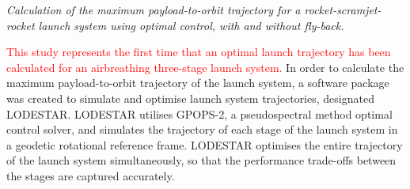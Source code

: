 	\vspace{10pt}
\emph{Calculation of the maximum payload-to-orbit trajectory for a rocket-scramjet-rocket launch system using optimal control, with and without fly-back.}

\textcolor{red}{This study represents the first time that an optimal launch trajectory has been calculated for an airbreathing three-stage launch system.}
In order to calculate the maximum payload-to-orbit trajectory of the launch system, a software package was created to simulate and optimise launch system trajectories, designated LODESTAR. LODESTAR utilises GPOPS-2, a pseudospectral method optimal control solver, and simulates the trajectory of each stage of the launch system in a geodetic rotational reference frame. 
LODESTAR optimises the entire trajectory of the launch system simultaneously, so that the performance trade-offs between the stages are captured accurately.


